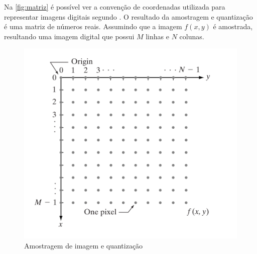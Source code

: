 Na \autoref{fig:matriz} é possível ver a convenção de coordenadas utilizada para representar imagens digitais segundo . O resultado da amostragem e quantização é uma matriz de números reais. Assumindo que a imagem $f(x,y)$ é amostrada, resultando uma imagem digital que possui $M$ linhas e $N$ colunas.


\begin{figure}[h]
	\caption{\label{fig:matriz}Amostragem de imagem e quantização}
	\begin{center}
	    \includegraphics[width=.9\textwidth]{resources/matriz}
	\end{center}
\end{figure}





